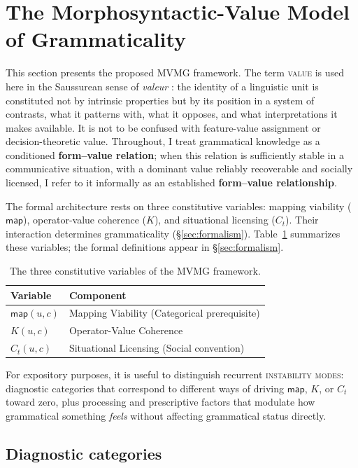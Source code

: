 \documentclass[12pt,letterpaper]{article}
\newcommand{\term}[1]{\textsc{#1}}
\newcommand{\mention}[1]{\textit{#1}}
\begin{document}
\section{The Morphosyntactic-Value Model of Grammaticality}\label{sec:framework}

This section presents the proposed MVMG framework. The term \term{value} is used here in the Saussurean sense of \mention{valeur} \autocite{saussure1916}: the identity of a linguistic unit is constituted not by intrinsic properties but by its position in a system of contrasts, what it patterns with, what it opposes, and what interpretations it makes available. It is not to be confused with feature-value assignment or decision-theoretic value. Throughout, I treat grammatical knowledge as a conditioned \textbf{form--value relation}; when this relation is sufficiently stable in a communicative situation, with a dominant value reliably recoverable and socially licensed, I refer to it informally as an established \textbf{form--value relationship}.

The formal architecture rests on three constitutive variables: mapping viability ($\mathsf{map}$), operator-value coherence ($K$), and situational licensing ($C_t$). Their interaction determines grammaticality (\S\ref{sec:formalism}). Table~\ref{tab:vars} summarizes these variables; the formal definitions appear in \S\ref{sec:formalism}.

\begin{table}[H]
\centering
\begin{tabular}{ll}
\toprule
Variable & Component \\
\midrule
$\mathsf{map}(u,c)$ & Mapping Viability (Categorical prerequisite) \\
$K(u,c)$ & Operator-Value Coherence \\
$C_t(u,c)$ & Situational Licensing (Social convention) \\
\bottomrule
\end{tabular}
\caption{The three constitutive variables of the MVMG framework.}
\label{tab:vars}
\end{table}

For expository purposes, it is useful to distinguish recurrent \term{instability modes}: diagnostic categories that correspond to different ways of driving $\mathsf{map}$, $K$, or $C_t$ toward zero, plus processing and prescriptive factors that modulate how grammatical something \emph{feels} without affecting grammatical status directly.

\subsection{Diagnostic categories}\label{sec:core-components}
\end{document}
